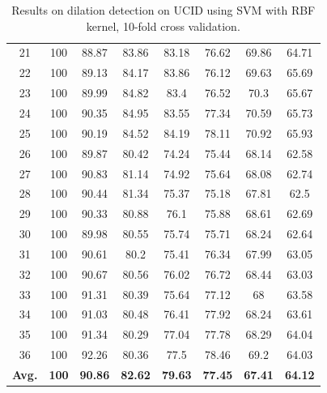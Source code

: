 \documentclass[review]{elsarticle}
\begin{document}
\begin{table}[ht!]
\begin{minipage}{0.48\linewidth}
{\begin{tabular}{c|ccccccc}
				21&100&88.87&83.86&83.18&76.62&69.86&64.71\\
				22&100&89.13&84.17&83.86&76.12&69.63&65.69\\
				23&100&89.99&84.82&83.4&76.52&70.3&65.67\\
				24&100&90.35&84.95&83.55&77.34&70.59&65.73\\
				25&100&90.19&84.52&84.19&78.11&70.92&65.93\\
				26&100&89.87&80.42&74.24&75.44&68.14&62.58\\
				27&100&90.83&81.14&74.92&75.64&68.08&62.74\\
				28&100&90.44&81.34&75.37&75.18&67.81&62.5\\
				29&100&90.33&80.88&76.1&75.88&68.61&62.69\\
				30&100&89.98&80.55&75.74&75.71&68.24&62.64\\
				31&100&90.61&80.2&75.41&76.34&67.99&63.05\\
				32&100&90.67&80.56&76.02&76.72&68.44&63.03\\
				33&100&91.31&80.39&75.64&77.12&68&63.58\\
				34&100&91.03&80.48&76.41&77.92&68.24&63.61\\
				35&100&91.34&80.29&77.04&77.78&68.29&64.04\\
				36&100&92.26&80.36&77.5&78.46&69.2&64.03\\
				\hline
				\textbf{Avg.}&\textbf{100}&\textbf{90.86}&\textbf{82.62}&\textbf{79.63}&\textbf{77.45}&\textbf{67.41}&\textbf{64.12}\\
				\hline\hline	
		\end{tabular}}
	\end{minipage}
	\begin{minipage}{0.48\linewidth}
		\centering
		\caption{Results on dilation detection on UCID using SVM with RBF kernel, 10-fold cross validation.}
		\label{table:uciddilation}
\end{minipage}
\end{table}
\end{document}
